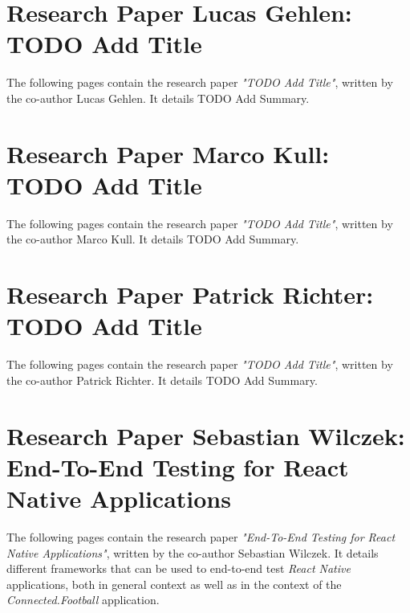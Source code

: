 \patchcmd{\appendices}{\quad}{: }{}{}
\begin{appendices}

\section{Research Paper Lucas Gehlen: TODO Add Title}
\label{appendix:research_paper_lucas_gehlen}

The following pages contain the research paper \textit{"TODO Add Title"}, written by the co-author Lucas Gehlen. It details TODO Add Summary.


\newpage

\section{Research Paper Marco Kull: TODO Add Title}
\label{appendix:research_paper_marco_kull}

The following pages contain the research paper \textit{"TODO Add Title"}, written by the co-author Marco Kull. It details TODO Add Summary.


\newpage

\section{Research Paper Patrick Richter: TODO Add Title}
\label{appendix:research_paper_patrick_richter}

The following pages contain the research paper \textit{"TODO Add Title"}, written by the co-author Patrick Richter. It details TODO Add Summary.


\newpage

\section{Research Paper Sebastian Wilczek: End-To-End Testing for React Native Applications}
\label{appendix:research_paper_sebastian_wilczek}

The following pages contain the research paper \textit{"End-To-End Testing for React Native Applications"}, written by the co-author Sebastian Wilczek. It details different frameworks that can be used to end-to-end test \textit{React Native} applications, both in general context as well as in the context of the \textit{Connected.Football} application.



\end{appendices}